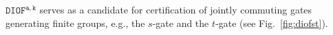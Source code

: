 \documentclass[../main.tex]{subfiles}
\begin{document}
$\mathtt{DIOF^{a,k}}$ serves as a candidate for certification of jointly commuting gates generating finite groups, e.g., the $s$-gate and the $t$-gate (see Fig.~\ref{fig:diofst}).



\end{document}
